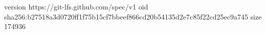 version https://git-lfs.github.com/spec/v1
oid sha256:b27518a3d0720ff1f75b15cf7bbeef866cd20b54135d2e7c85f22cd25ec9a745
size 174936
